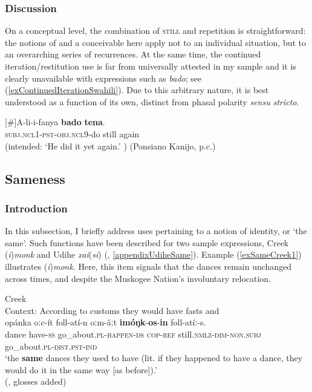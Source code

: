 \subsubsection{Discussion}
On a conceptual level, the combination of \textsc{still} and repetition is straightforward: the notions of  and a conceivable  here apply not to an individual situation, but to an overarching series of recurrences. At the same time, the continued iteration/restitution use is far from universally attested in my sample and it is clearly unavailable with expressions such as  \textit{bado};  see (\ref{exContinuedIterationSwahili}). Due to this arbitrary nature, it is best understood as a function of its own, distinct from phasal polarity \textit{sensu stricto}.

\begin{exe}
	\exi{}[\#]{\gll A-li-i-fanya \textbf{bado} \textbf{tena}.\\
	\textsc{subj}.\textsc{ncl}1-\textsc{pst}-\textsc{obj}.\textsc{ncl}9-do still again\\	
	\glt (intended: \lq He did it yet again.\rq{ }) (Ponsiano Kanijo, p.c.)}
\end{exe}

\subsection{Sameness}\label{sectionSame}
\subsubsection{Introduction} In this subsection, I briefly address uses pertaining to a notion of identity, or \lq the same\rq{}. Such functions have been described for two sample expressions, Creek \mbox{(\textit{i})\textit{monk}} and Udihe \textit{xai}(\textit{si}) (,  \ref{appendixUdiheSame}). Example (\ref{exSameCreek1}) illustrates \mbox{(\textit{i})\textit{monk}}. Here, this item signals that the dances remain unchanged across times, and despite the Muskogee Nation's involuntary relocation.

\begin{exe}
	\ex Creek \label{exSameCreek1}\\
Context: According to customs they would have fasts and \\
	 \gll opánka oːc-ít  foll-atí-n oːm-âːt \textbf{imóŋk}-\textbf{os}-\textbf{in} foll-atíː-s.\\
dance have-\textsc{ss} go\_about.\textsc{pl}-\textsc{happen}-\textsc{ds} \textsc{cop}-\textsc{ref} still.\textsc{nmlz}-\textsc{dim}-\textsc{non}.\textsc{subj} go\_about.\textsc{pl}-\textsc{dist.pst}-\textsc{ind}\\
	\glt \lq the \textbf{same} dances they used to have (lit. if they happened to have a dance, they would do it in the same way [as before]).\rq{}
	\\(\cite[57–58]{HaasHill2014},  glosses added)
\end{exe}

